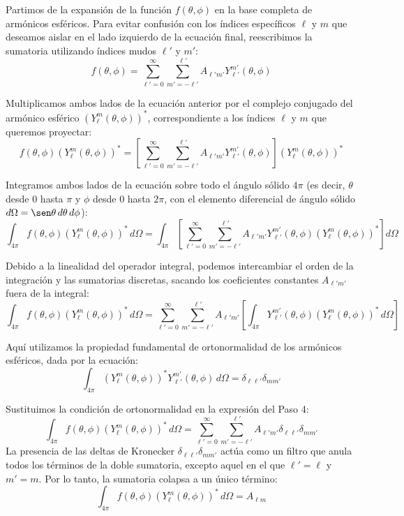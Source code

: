 \documentclass[a4paper]{article}
\begin{document}
Partimos de la expansión de la función $f(\theta, \phi)$ en la base completa de armónicos esféricos. Para evitar confusión con los índices específicos $\ell$ y $m$ que deseamos aislar en el lado izquierdo de la ecuación final, reescribimos la sumatoria utilizando índices mudos $\ell'$ y $m'$:
$$f(\theta, \phi) = \sum_{\ell'=0}^{\infty} \sum_{m'=-\ell'}^{\ell'} A_{\ell' m'} Y_{\ell'}^{m'}(\theta, \phi)$$

Multiplicamos ambos lados de la ecuación anterior por el complejo conjugado del armónico esférico $(Y_\ell^m(\theta, \phi))^*$, correspondiente a los índices $\ell$ y $m$ que queremos proyectar:
$$f(\theta, \phi) (Y_\ell^m(\theta, \phi))^* = \left[ \sum_{\ell'=0}^{\infty} \sum_{m'=-\ell'}^{\ell'} A_{\ell' m'} Y_{\ell'}^{m'}(\theta, \phi) \right] (Y_\ell^m(\theta, \phi))^*$$

Integramos ambos lados de la ecuación sobre todo el ángulo sólido $4\pi$ (es decir, $\theta$ desde $0$ hasta $\pi$ y $\phi$ desde $0$ hasta $2\pi$, con el elemento diferencial de ángulo sólido $d\Omega = \sen\theta \, d\theta \, d\phi$):
$$\int_{4\pi} f(\theta, \phi) (Y_\ell^m(\theta, \phi))^* \, d\Omega = \int_{4\pi} \left[ \sum_{\ell'=0}^{\infty} \sum_{m'=-\ell'}^{\ell'} A_{\ell' m'} Y_{\ell'}^{m'}(\theta, \phi) (Y_\ell^m(\theta, \phi))^* \right] d\Omega$$

Debido a la linealidad del operador integral, podemos intercambiar el orden de la integración y las sumatorias discretas, sacando los coeficientes constantes $A_{\ell' m'}$ fuera de la integral:
$$\int_{4\pi} f(\theta, \phi) (Y_\ell^m(\theta, \phi))^* \, d\Omega = \sum_{\ell'=0}^{\infty} \sum_{m'=-\ell'}^{\ell'} A_{\ell' m'} \left[ \int_{4\pi} Y_{\ell'}^{m'}(\theta, \phi) (Y_\ell^m(\theta, \phi))^* \, d\Omega \right]$$

Aquí utilizamos la propiedad fundamental de ortonormalidad de los armónicos esféricos, dada por la ecuación:
$$\int_{4\pi} (Y_\ell^m(\theta, \phi))^* Y_{\ell'}^{m'}(\theta, \phi) \, d\Omega = \delta_{\ell \ell'} \delta_{m m'}$$

Sustituimos la condición de ortonormalidad en la expresión del Paso 4:
$$\int_{4\pi} f(\theta, \phi) (Y_\ell^m(\theta, \phi))^* \, d\Omega = \sum_{\ell'=0}^{\infty} \sum_{m'=-\ell'}^{\ell'} A_{\ell' m'} \delta_{\ell \ell'} \delta_{m m'}$$
La presencia de las deltas de Kronecker $\delta_{\ell \ell'} \delta_{m m'}$ actúa como un filtro que anula todos los términos de la doble sumatoria, excepto aquel en el que $\ell' = \ell$ y $m' = m$. Por lo tanto, la sumatoria colapsa a un único término:
$$\int_{4\pi} f(\theta, \phi) (Y_\ell^m(\theta, \phi))^* \, d\Omega = A_{\ell m}$$
\end{document}
